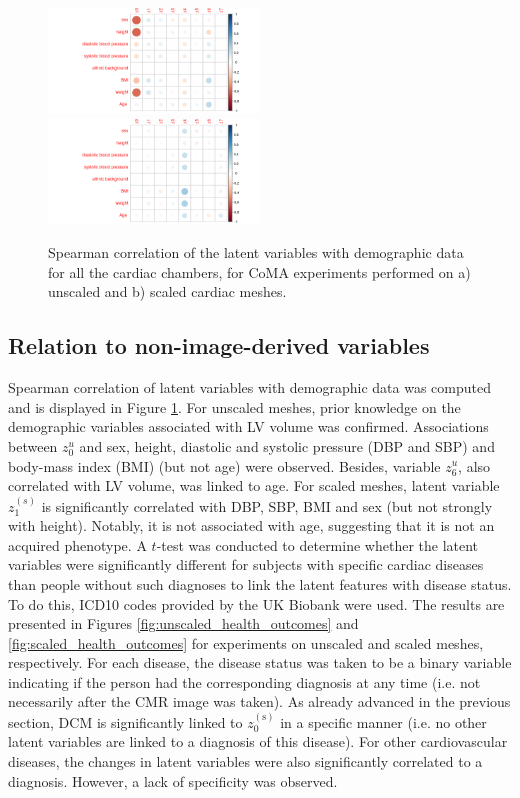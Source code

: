 \begin{figure}[ht!]
\includegraphics[width=0.5\textwidth]{figs/correlation/experiment_2_vs_demographic_data}
\includegraphics[width=0.5\textwidth]{figs/correlation/experiment_1_vs_demographic_data}
\caption{Spearman correlation of the latent variables with demographic data for all the cardiac chambers, for CoMA experiments performed on a) unscaled and b) scaled cardiac meshes.}
\label{fig:relation_to_demographic}
\end{figure}


\subsection*{Relation to non-image-derived variables}
\label{subsec_GWAS}
Spearman correlation of latent variables with demographic data was computed and is displayed in Figure \ref{fig:relation_to_demographic}.
For unscaled meshes, prior knowledge on the demographic variables associated with LV volume was confirmed. Associations between $z_0^{u}$ and sex, height, diastolic and systolic pressure (DBP and SBP) and body-mass index (BMI) (but not age) were observed. Besides, variable $z_6^{u}$, also correlated with LV volume, was linked to age. For scaled meshes, latent variable $z_1^{(s)}$ is significantly correlated with DBP, SBP, BMI and sex (but not strongly with height). Notably, it is not associated with age, suggesting that it is not an acquired phenotype.
A $t$-test was conducted to determine whether the latent variables were significantly different for subjects with specific cardiac diseases than people without such diagnoses to link the latent features with disease status. To do this, ICD10 codes provided by the UK Biobank were used. The results are presented in Figures  \ref{fig:unscaled_health_outcomes} and \ref{fig:scaled_health_outcomes} for experiments on unscaled and scaled meshes, respectively. For each disease, the disease status was taken to be a binary variable indicating if the person had the corresponding diagnosis at any time (i.e. not necessarily after the CMR image was taken). As already advanced in the previous section, DCM is significantly linked to $z_0^{(\text{s})}$ in a specific manner (i.e. no other latent variables are linked to a diagnosis of this disease). For other cardiovascular diseases, the changes in latent variables were also significantly correlated to a diagnosis. However, a lack of specificity was observed.


